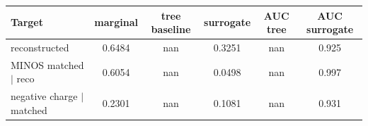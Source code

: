 \begin{tabular}{lccccc}
\toprule
Target & marginal & tree baseline & surrogate & AUC tree & AUC surrogate \\
\midrule
reconstructed & 0.6484 & nan & 0.3251 & nan & 0.925 \\
MINOS matched $\mid$ reco & 0.6054 & nan & 0.0498 & nan & 0.997 \\
negative charge $\mid$ matched & 0.2301 & nan & 0.1081 & nan & 0.931 \\
\bottomrule
\end{tabular}
